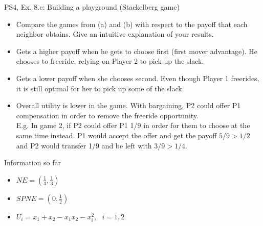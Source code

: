 \begin{frame}{PS4, Ex. 8.c: Building a playground (Stackelberg game)}
    \begin{itemize}
        \item[(c)] Compare the games from (a) and (b) with respect to the payoff that each neighbor obtains. Give an intuitive explanation of your results.
    \end{itemize}
    \vfill\null
  \begin{multicols}{2}
    \begin{itemize}
      \item[(Player 1)] Gets a higher payoff when he gets to choose first (first mover advantage). He chooses to freeride, relying on Player 2 to pick up the slack.
      \item[(Player 2)] Gets a lower payoff when she chooses second. Even though Player 1 freerides, it is still optimal for her to pick up some of the slack.
      \item[(Total U)] Overall utility is lower in the  game. With bargaining, P2 could offer P1 compensation in order to remove the freeride opportunity.\\
      E.g. In game 2, if P2 could offer P1 1/9 in order for them to choose at the same time instead. P1 would accept the offer and get the payoff $5/9>1/2$ and P2 would transfer 1/9 and be left with $3/9>1/4$.
    \end{itemize}
    \vfill\null \columnbreak
    Information so far
    \begin{itemize}
      \item[G1] \begin{math}NE=\left(\frac{1}{3},\frac{1}{3}\right)\end{math}
      \item[G2] \begin{math}SPNE=\left(0,\frac{1}{2}\right)\end{math}
      \item[Utility] \begin{math}U_i=x_1+x_2-x_1x_2-x_i^2,\ \ \ i=1,2  \end{math}

\end{itemize}
\end{multicols}
\end{frame}
